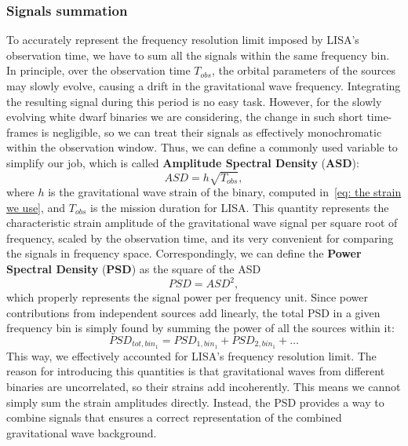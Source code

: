 \subsubsection{Signals summation}
To accurately represent the frequency resolution limit imposed by LISA's observation time, we have to sum all the signals within the same frequency bin. 
In principle, over the observation time $T_{obs}$, the orbital parameters of the sources may slowly evolve, causing a drift in the gravitational wave frequency. 
Integrating the resulting signal during this period is no easy task.
However, for the slowly evolving white dwarf binaries we are considering, the change in such short time-frames is negligible, so we can treat their signals as effectively monochromatic within the observation window. 
Thus, we can define a commonly used variable to simplify our job, which is called  \textbf{Amplitude Spectral Density} (\textbf{ASD}):
\begin{equation}
    ASD = h\sqrt{T_{obs}},
    \label{eq: ASD definition}
\end{equation}
where $h$ is the gravitational wave strain of the binary, computed in~\eqref{eq: the strain we use}, and $T_{obs}$ is the mission duration for LISA.
This quantity represents the characteristic strain amplitude of the gravitational wave signal per square root of frequency, scaled by the observation time, and its very convenient for comparing the signals in frequency space.
Correspondingly, we can define the \textbf{Power Spectral Density} (\textbf{PSD}) as the square of the ASD
\begin{equation}
    PSD = ASD^2,
    \label{eq: PSD definition}
\end{equation}
which properly represents the signal power per frequency unit.
Since power contributions from independent sources add linearly, the total PSD in a given frequency bin is simply found by summing the power of all the sources within it:
\begin{equation}
    PSD_{tot,bin_1} = PSD_{1,bin_1} + PSD_{2,bin_1} + \dots
    \label{eq: total PSD}
\end{equation}
This way, we effectively accounted for LISA's frequency resolution limit.
The reason for introducing this quantities is that gravitational waves from different binaries are uncorrelated, so their strains add incoherently. 
This means we cannot simply sum the strain amplitudes directly.
Instead, the PSD provides a way to combine signals that ensures a correct representation of the combined gravitational wave background.

